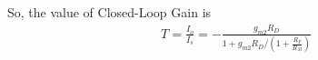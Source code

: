 \begin{enumerate}[label=\thesubsection.\arabic*.,ref=\thesubsection.\theenumi]
So, the value of Closed-Loop Gain is
\begin{align}
T = \frac{I_{o}}{I_{s}}=-\frac{g_{m 2} R_{D}}{1+g_{m 2} R_{D} /\left(1+\frac{R_{F}}{R_{M}}\right)}
\end{align}

\end{enumerate}
